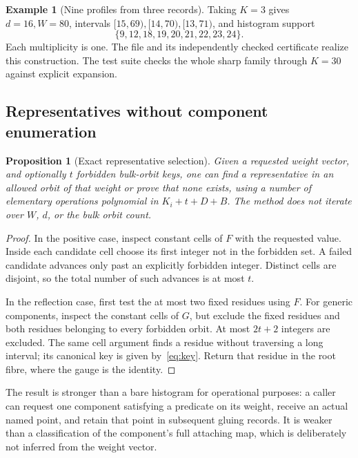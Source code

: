\documentclass[11pt]{article}
\newtheorem{proposition}[theorem]{Proposition}
\theoremstyle{definition}
\newtheorem{example}[theorem]{Example}
\begin{document}
\begin{example}[Nine profiles from three records]
Taking $K=3$ gives $d=16,W=80$, intervals $[15,69),[14,70),[13,71)$, and histogram support
\[
 \{9,12,18,19,20,21,22,23,24\}.
\]
Each multiplicity is one. The file  and its independently checked certificate realize this construction. The test suite checks the whole sharp family through $K=30$ against explicit expansion.
\end{example}

\subsection{Representatives without component enumeration}
\begin{proposition}[Exact representative selection]
\label{prop:representatives}
Given a requested weight vector, and optionally $t$ forbidden bulk-orbit keys, one can find a representative in an allowed orbit of that weight or prove that none exists, using a number of elementary operations polynomial in $K_i+t+D+B$. The method does not iterate over $W$, $d$, or the bulk orbit count.
\end{proposition}
\begin{proof}
In the positive case, inspect constant cells of $F$ with the requested value. Inside each candidate cell choose its first integer not in the forbidden set. A failed candidate advances only past an explicitly forbidden integer. Distinct cells are disjoint, so the total number of such advances is at most $t$.

In the reflection case, first test the at most two fixed residues using $F$. For generic components, inspect the constant cells of $G$, but exclude the fixed residues and both residues belonging to every forbidden orbit. At most $2t+2$ integers are excluded. The same cell argument finds a residue without traversing a long interval; its canonical key is given by~\eqref{eq:key}. Return that residue in the root fibre, where the gauge is the identity.
\end{proof}

The result is stronger than a bare histogram for operational purposes: a caller can request one component satisfying a predicate on its weight, receive an actual named point, and retain that point in subsequent gluing records. It is weaker than a classification of the component's full attaching map, which is deliberately not inferred from the weight vector.
\end{document}
